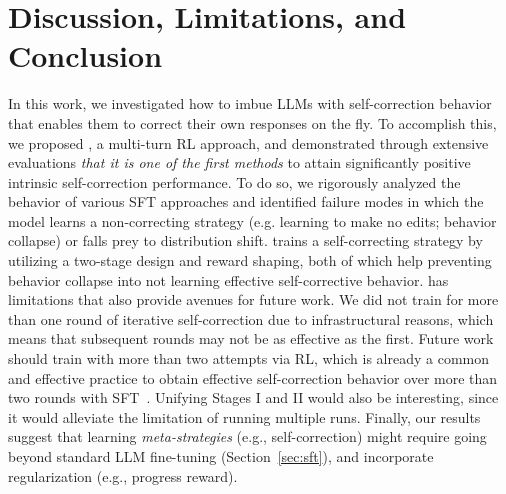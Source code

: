 \vspace{-0.2cm}
\section{Discussion, Limitations, and Conclusion}
\vspace{-0.2cm}

In this work, we investigated how to imbue LLMs with self-correction behavior that enables them to correct their own responses on the fly. To accomplish this, we proposed \methodname{}, a multi-turn RL approach, and demonstrated through extensive evaluations \emph{that it is one of the first methods} to attain significantly positive intrinsic self-correction performance. To do so, we rigorously analyzed the behavior of various SFT approaches and identified failure modes in which the model learns a non-correcting strategy (e.g. learning to make no edits; behavior collapse) or falls prey to distribution shift. \methodname{} trains a self-correcting strategy by utilizing a two-stage design and reward shaping, both of which help preventing behavior collapse into not learning effective self-corrective behavior. 
\methodname{} has limitations that also provide avenues for future work. We did not train \methodname{} for more than one round of iterative self-correction due to infrastructural reasons, which means that subsequent rounds may not be as effective as the first. Future work should train with more than two attempts via RL, which is already a common and effective practice to obtain effective self-correction behavior over more than two rounds with SFT~\citep{snell2024scaling,qu2024recursive}. Unifying Stages I and II would also be interesting, since it would alleviate the limitation of running multiple runs. Finally, our results suggest that learning \emph{meta-strategies} (e.g., self-correction) might require going beyond standard LLM fine-tuning (Section~\ref{sec:sft}), and incorporate regularization (e.g., progress reward).


